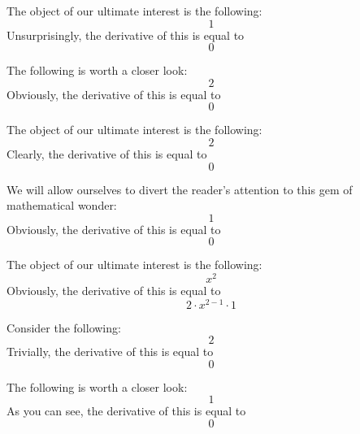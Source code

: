 \documentclass{article}
\begin{document}
The object of our ultimate interest is the following:
\begin{equation}
1 
\end{equation}
Unsurprisingly, the derivative of this is equal to
\begin{equation}
0 
\end{equation}

The following is worth a closer look:
\begin{equation}
2 
\end{equation}
Obviously, the derivative of this is equal to
\begin{equation}
0 
\end{equation}

The object of our ultimate interest is the following:
\begin{equation}
2 
\end{equation}
Clearly, the derivative of this is equal to
\begin{equation}
0 
\end{equation}

We will allow ourselves to divert the reader's attention to this gem of mathematical wonder:
\begin{equation}
1 
\end{equation}
Obviously, the derivative of this is equal to
\begin{equation}
0 
\end{equation}

The object of our ultimate interest is the following:
\begin{equation}
x ^{2 } 
\end{equation}
Obviously, the derivative of this is equal to
\begin{equation}
2 \cdot x ^{2 - 1 } \cdot 1 
\end{equation}

Consider the following:
\begin{equation}
2 
\end{equation}
Trivially, the derivative of this is equal to
\begin{equation}
0 
\end{equation}

The following is worth a closer look:
\begin{equation}
1 
\end{equation}
As you can see, the derivative of this is equal to
\begin{equation}
0 
\end{equation}
\end{document}
